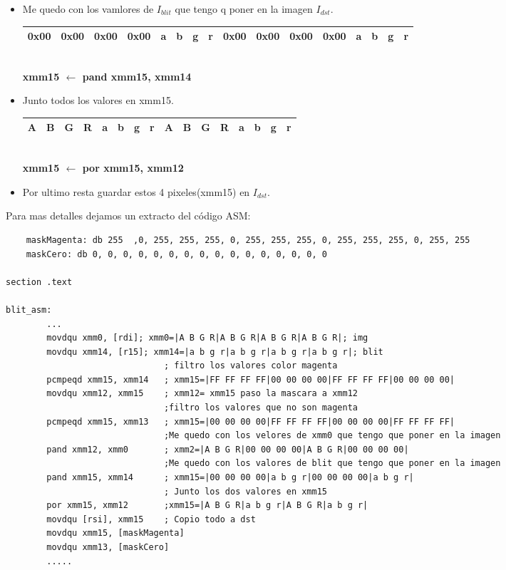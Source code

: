 \begin{itemize}
	\item Me quedo con los vamlores de $I_{blit}$ que tengo q poner en la imagen $I_{dst}$.
		\begin{center}
		   \begin{tabular}{| c | c | c | c || c | c | c | c || c | c | c | c || c | c | c | c |}
			 \hline
			 0x00 & 0x00 & 0x00 & 0x00 & a & b & g & r & 0x00 & 0x00 & 0x00 & 0x00 & a & b & g & r \\ \hline
		   \end{tabular}
		   \\ \textbf{xmm15 $\gets$ pand xmm15, xmm14}
		\end{center}		
	
	\item Junto todos los valores en xmm15.
		\begin{center}
		   \begin{tabular}{| c | c | c | c || c | c | c | c || c | c | c | c || c | c | c | c |}
			 \hline
			 A & B & G & R & a & b & g & r & A & B & G & R & a & b & g & r \\ \hline
		   \end{tabular}
		   \\ \textbf{xmm15 $\gets$ por xmm15, xmm12}
		\end{center}		
	\item Por ultimo resta guardar estos 4 pixeles(xmm15) en $I_{dst}$.

\end{itemize}

Para mas detalles dejamos un extracto del código ASM:

\begin{codesnippet}
\begin{verbatim}
	maskMagenta: db 255	 ,0, 255, 255, 255, 0, 255, 255, 255, 0, 255, 255, 255, 0, 255, 255
	maskCero: db 0, 0, 0, 0, 0, 0, 0, 0, 0, 0, 0, 0, 0, 0, 0, 0 

section .text

blit_asm:
		...
		movdqu xmm0, [rdi]; xmm0=|A B G R|A B G R|A B G R|A B G R|; img	
		movdqu xmm14, [r15]; xmm14=|a b g r|a b g r|a b g r|a b g r|; blit
							   ; filtro los valores color magenta
		pcmpeqd xmm15, xmm14   ; xmm15=|FF FF FF FF|00 00 00 00|FF FF FF FF|00 00 00 00| 
		movdqu xmm12, xmm15	   ; xmm12= xmm15 paso la mascara a xmm12 
							   ;filtro los valores que no son magenta
		pcmpeqd xmm15, xmm13   ; xmm15=|00 00 00 00|FF FF FF FF|00 00 00 00|FF FF FF FF|
							   ;Me quedo con los velores de xmm0 que tengo que poner en la imagen
		pand xmm12, xmm0       ; xmm2=|A B G R|00 00 00 00|A B G R|00 00 00 00|
							   ;Me quedo con los valores de blit que tengo que poner en la imagen
		pand xmm15, xmm14      ; xmm15=|00 00 00 00|a b g r|00 00 00 00|a b g r|
							   ; Junto los dos valores en xmm15
		por xmm15, xmm12 	   ;xmm15=|A B G R|a b g r|A B G R|a b g r|
		movdqu [rsi], xmm15	   ; Copio todo a dst
		movdqu xmm15, [maskMagenta]
		movdqu xmm13, [maskCero]
		.....
\end{verbatim}
\end{codesnippet}
